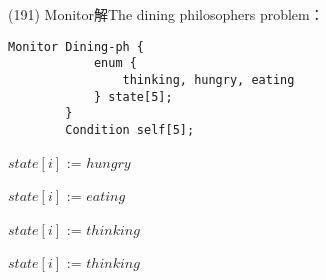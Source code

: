 \begin{theorem}{(191)} Monitor解The dining philosophers problem：
    \begin{lstlisting}[caption={Data structure (The dining philosophers problem (Monitor)).}, captionpos=b, mathescape=true]
        Monitor Dining-ph {
            enum {
                thinking, hungry, eating
            } state[5];
        } 
        Condition self[5];
    \end{lstlisting}
    \begin{algorithm}[H]
        \caption{$pickup(i)$.}
        \begin{algorithmic}[1]
                \State $state[i]$ := $hungry$
                \State {}
                    \State {}
                \EndIf
            \EndFunction
        \end{algorithmic}
    \end{algorithm}
    \begin{algorithm}[H]
        \caption{$test(i)$.}
        \begin{algorithmic}[1]
                    \State $state[i]$ := $eating$
                    \State {}
                \EndIf
            \EndFunction
        \end{algorithmic}
    \end{algorithm}
    \begin{algorithm}[H]
        \caption{$putdown(i)$.}
        \begin{algorithmic}[1]
                \State $state[i]$ := $thinking$
                \State {}
                \State {}
            \EndFunction
        \end{algorithmic}
    \end{algorithm}
    \begin{algorithm}[H]
        \caption{$initialization\_code(i)$.}
        \begin{algorithmic}[1]
             
                    \State $state[i]$ := $thinking$
                \EndFor
            \EndFunction
        \end{algorithmic}

\end{algorithm}
\end{theorem}

